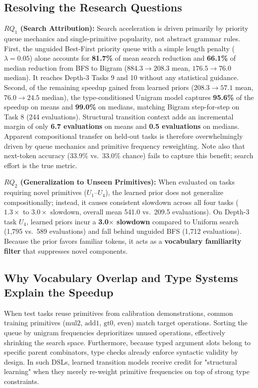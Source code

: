 \documentclass[10pt,twocolumn]{article}
\begin{document}
\subsection{Resolving the Research Questions}

\textbf{\texorpdfstring{$RQ_1$}{RQ1} (Search Attribution):} Search acceleration is driven primarily by priority queue mechanics and single-primitive popularity, not abstract grammar rules. First, the unguided Best-First priority queue with a simple length penalty ($\lambda = 0.05$) alone accounts for \textbf{81.7\%} of mean search reduction and \textbf{66.1\%} of median reduction from BFS to Bigram ($884.3 \to 208.3$ mean, $176.5 \to 76.0$ median). It reaches Depth-3 Tasks 9 and 10 without any statistical guidance. Second, of the remaining speedup gained from learned priors ($208.3 \to 57.1$ mean, $76.0 \to 24.5$ median), the type-conditioned Unigram model captures \textbf{95.6\%} of the speedup on means and \textbf{99.0\%} on medians, matching Bigram step-for-step on Task 8 (244 evaluations). Structural transition context adds an incremental margin of only \textbf{6.7 evaluations} on means and \textbf{0.5 evaluations} on medians. Apparent compositional transfer on held-out tasks is therefore overwhelmingly driven by queue mechanics and primitive frequency reweighting. Note also that next-token accuracy (33.9\% vs.\ 33.0\% chance) fails to capture this benefit; search effort is the true metric.

\textbf{\texorpdfstring{$RQ_2$}{RQ2} (Generalization to Unseen Primitives):} When evaluated on tasks requiring novel primitives ($U_1$--$U_4$), the learned prior does not generalize compositionally; instead, it causes consistent slowdown across all four tasks ($1.3\times$ to $3.0\times$ slowdown, overall mean 541.0 vs.\ 209.5 evaluations). On Depth-3 task $U_4$, learned priors incur a \textbf{3.0$\times$ slowdown} compared to Uniform search (1,795 vs.\ 589 evaluations) and fall behind unguided BFS (1,712 evaluations). Because the prior favors familiar tokens, it acts as a \textbf{vocabulary familiarity filter} that suppresses novel components.

\subsection{Why Vocabulary Overlap and Type Systems Explain the Speedup}
When test tasks reuse primitives from calibration demonstrations, common training primitives ($\text{mul2}$, $\text{add1}$, $\text{gt0}$, $\text{even}$) match target operations. Sorting the queue by unigram frequencies deprioritizes unused operations, effectively shrinking the search space. Furthermore, because typed argument slots belong to specific parent combinators, type checks already enforce syntactic validity by design. In such DSLs, learned transition models receive credit for "structural learning" when they merely re-weight primitive frequencies on top of strong type constraints.
\end{document}
